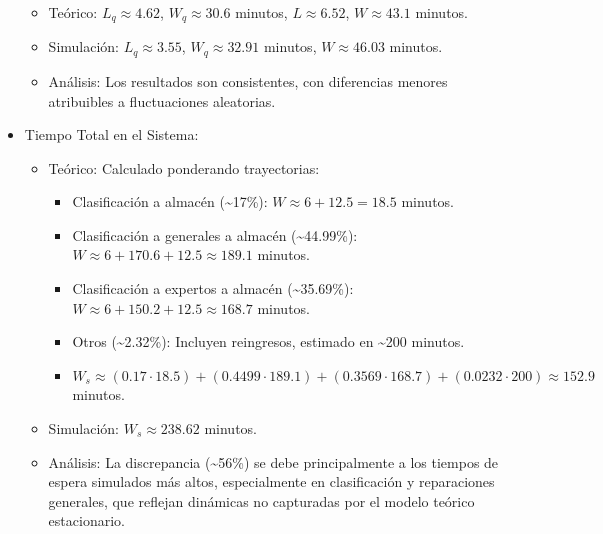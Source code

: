 \documentclass[12pt]{article}
\begin{document}
\begin{itemize}
    \begin{itemize}
        \item Teórico: $L_q \approx 4.62$, $W_q \approx 30.6$ minutos, $L \approx 6.52$, $W \approx 43.1$ minutos.
        \item Simulación: $L_q \approx 3.55$, $W_q \approx 32.91$ minutos, $W \approx 46.03$ minutos.
        \item Análisis: Los resultados son consistentes, con diferencias menores atribuibles a fluctuaciones aleatorias.
    \end{itemize}
    \item Tiempo Total en el Sistema:
    \begin{itemize}
        \item Teórico: Calculado ponderando trayectorias:
        \begin{itemize}
            \item Clasificación a almacén (\textasciitilde 17\%): $W \approx 6 + 12.5 = 18.5$ minutos.
            \item Clasificación a generales a almacén (\textasciitilde 44.99\%): $W \approx 6 + 170.6 + 12.5 \approx 189.1$ minutos.
            \item Clasificación a expertos a almacén (\textasciitilde 35.69\%): $W \approx 6 + 150.2 + 12.5 \approx 168.7$ minutos.
            \item Otros (\textasciitilde 2.32\%): Incluyen reingresos, estimado en \textasciitilde 200 minutos.
            \item $W_s \approx (0.17 \cdot 18.5) + (0.4499 \cdot 189.1) + (0.3569 \cdot 168.7) + (0.0232 \cdot 200) \approx 152.9$ minutos.
        \end{itemize}
        \item Simulación: $W_s \approx 238.62$ minutos.
        \item Análisis: La discrepancia (\textasciitilde 56\%) se debe principalmente a los tiempos de espera simulados más altos, especialmente en clasificación y reparaciones generales, que reflejan dinámicas no capturadas por el modelo teórico estacionario.
    \end{itemize}
\end{itemize}
\end{document}
